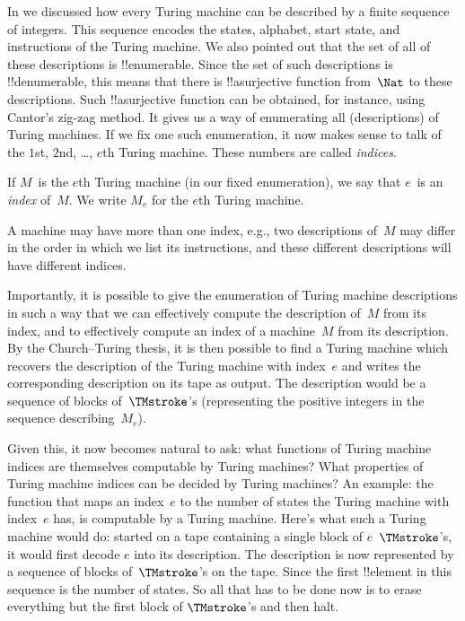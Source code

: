 \documentclass[../../../include/open-logic-section]{subfiles}
\begin{document}

In  we discussed how every Turing machine can be
described by a finite sequence of integers. This sequence encodes the
states, alphabet, start state, and instructions of the Turing machine.
We also pointed out that the set of all of these descriptions is
!!{enumerable}. Since the set of such descriptions is !!{denumerable},
this means that there is !!a{surjective} function from~$\Nat$ to
these descriptions. Such !!a{surjective} function can be obtained, for
instance, using Cantor's zig-zag method.  It gives us a way of
enumerating all (descriptions) of Turing machines. If we fix one such
enumeration, it now makes sense to talk of the $1$st, $2$nd, \dots,
$e$th Turing machine.  These numbers are called \emph{indices}.

\begin{defn}
If $M$~is the $e$th Turing machine (in our fixed enumeration), we
say that $e$~is an \emph{index} of~$M$. We write $M_e$ for the $e$th
Turing machine.
\end{defn}

A machine may have more than one index, e.g., two descriptions of~$M$
may differ in the order in which we list its instructions, and these
different descriptions will have different indices.

Importantly, it is possible to give the enumeration of Turing machine
descriptions in such a way that we can effectively compute the
description of~$M$ from its index, and to effectively compute an index
of a machine~$M$ from its description.  By the Church--Turing thesis,
it is then possible to find a Turing machine which recovers the
description of the Turing machine with index~$e$ and writes the
corresponding description on its tape as output. The description would
be a sequence of blocks of~$\TMstroke$'s (representing the positive
integers in the sequence describing~$M_e$).

Given this, it now becomes natural to ask: what functions of Turing
machine indices are themselves computable by Turing machines? What
properties of Turing machine indices can be decided by Turing
machines?  An example: the function that maps an index~$e$ to the
number of states the Turing machine with index~$e$ has, is computable
by a Turing machine. Here's what such a Turing machine would do:
started on a tape containing a single block of $e$~$\TMstroke$'s, it
would first decode $e$ into its description. The description is now
represented by a sequence of blocks of~$\TMstroke$'s on the tape.
Since the first !!{element} in this sequence is the number of states.
So all that has to be done now is to erase everything but the first
block of $\TMstroke$'s and then halt.
\end{document}
